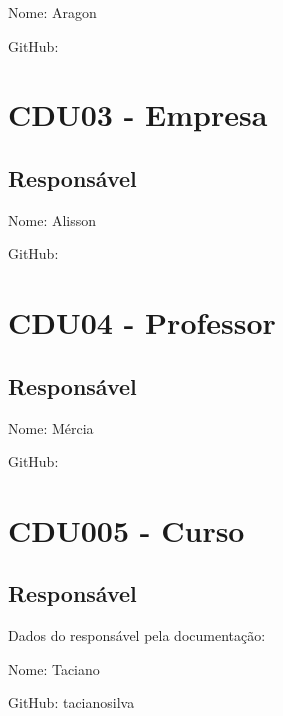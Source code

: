 \documentclass[12pt,a4paper]{report}
\begin{document}
Nome: Aragon

GitHub:



\section{CDU03 - Empresa}

\subsection{Responsável}

Nome: Alisson

GitHub:



\section{CDU04 - Professor}

\subsection{Responsável}

Nome: Mércia

GitHub:



\section{CDU005 - Curso}

\subsection{Responsável}

Dados do responsável pela documentação:

Nome: Taciano

GitHub: tacianosilva







%
\end{document}
